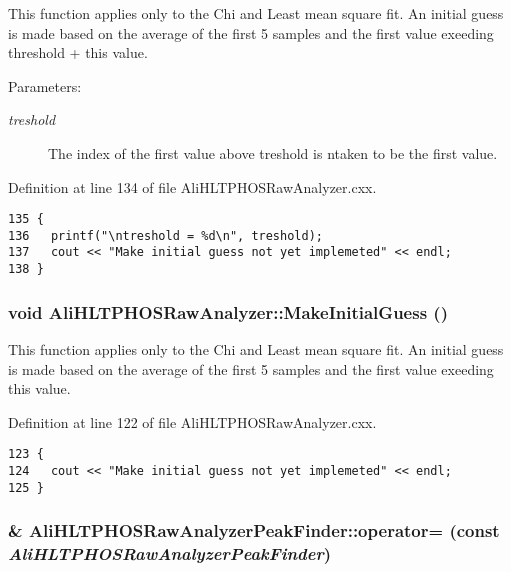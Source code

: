 This function applies only to the Chi and Least mean square fit. An initial guess is made based on the average of the first 5 samples and the first value exeeding threshold + this value. \begin{Desc}
\item[Parameters:]
\begin{description}
\item[{\em treshold}]The index of the first value above treshold is ntaken to be the first value. \end{description}
\end{Desc}


Definition at line 134 of file Ali\-HLTPHOSRaw\-Analyzer.cxx.

\footnotesize\begin{verbatim}135 {
136   printf("\ntreshold = %d\n", treshold);
137   cout << "Make initial guess not yet implemeted" << endl;  
138 }
\end{verbatim}\normalsize 


\subsubsection{\setlength{\rightskip}{0pt plus 5cm}void Ali\-HLTPHOSRaw\-Analyzer::Make\-Initial\-Guess ()\hspace{0.3cm}{\tt  [inherited]}}\label{classAliHLTPHOSRawAnalyzer_AliHLTPHOSRawAnalyzerPeakFindera14}


This function applies only to the Chi and Least mean square fit. An initial guess is made based on the average of the first 5 samples and the first value exeeding this value. 

Definition at line 122 of file Ali\-HLTPHOSRaw\-Analyzer.cxx.

\footnotesize\begin{verbatim}123 {
124   cout << "Make initial guess not yet implemeted" << endl;
125 }
\end{verbatim}\normalsize 


\subsubsection{\& Ali\-HLTPHOSRaw\-Analyzer\-Peak\-Finder::operator= (const  {\em Ali\-HLTPHOSRaw\-Analyzer\-Peak\-Finder})\hspace{0.3cm}{\tt  [inline]}}\label{classAliHLTPHOSRawAnalyzerPeakFinder_AliHLTPHOSRawAnalyzerPeakFindera2}




